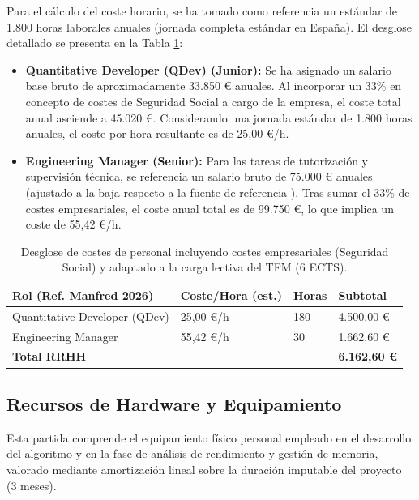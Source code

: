\documentclass[11pt]{article}
\begin{document}
Para el cálculo del coste horario, se ha tomado como referencia un estándar de 1.800 horas laborales anuales (jornada completa estándar en España). El desglose detallado se presenta en la Tabla \ref{tab:rrhh}:

\begin{itemize}
 \item \textbf{Quantitative Developer (QDev) (Junior):} Se ha asignado un salario base bruto de aproximadamente 33.850 \euro{} anuales. Al incorporar un 33\% en concepto de costes de Seguridad Social a cargo de la empresa, el coste total anual asciende a 45.020 \euro{}. Considerando una jornada estándar de 1.800 horas anuales, el coste por hora resultante es de 25,00 \euro/h.
 \item \textbf{Engineering Manager (Senior):} Para las tareas de tutorización y supervisión técnica, se referencia un salario bruto de 75.000 \euro{} anuales (ajustado a la baja respecto a la fuente de referencia \cite{manfred2026}). Tras sumar el 33\% de costes empresariales, el coste anual total es de 99.750 \euro{}, lo que implica un coste de 55,42 \euro/h.
\end{itemize}

\begin{table}[h!]
\centering
\small
\begin{tabularx}{\textwidth}{lXXX}
\toprule
\textbf{Rol (Ref. Manfred 2026)} & \textbf{Coste/Hora (est.)} & \textbf{Horas} & \textbf{Subtotal} \\ \midrule
Quantitative Developer (QDev)    & 25,00 \euro/h              & 180            & 4.500,00 \euro    \\
Engineering Manager              & 55,42 \euro/h              & 30             & 1.662,60 \euro    \\ \midrule
\textbf{Total RRHH}              &                            &                & \textbf{6.162,60 \euro} \\ \bottomrule
\end{tabularx}
\caption{Desglose de costes de personal incluyendo costes empresariales (Seguridad Social) y adaptado a la carga lectiva del TFM (6 ECTS).}
\label{tab:rrhh}
\end{table}

\subsection{Recursos de Hardware y Equipamiento}

Esta partida comprende el equipamiento físico personal empleado en el desarrollo del algoritmo y en la fase de análisis de rendimiento y gestión de memoria, valorado mediante amortización lineal sobre la duración imputable del proyecto (3 meses).
\end{document}
